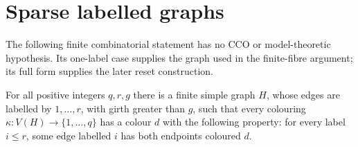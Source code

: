 \section{Sparse labelled graphs}\label{sec:sparse-labelled-graphs}

The following finite combinatorial statement has no CCO or model-theoretic
hypothesis. Its one-label case supplies the graph used in the finite-fibre
argument; its full form supplies the later reset construction.

\begin{lemma}\label{lem:sparse-labelled-graph}
For all positive integers \(q,r,g\) there is a finite simple graph \(H\),
whose edges are labelled by \(1,\ldots,r\), with girth greater than \(g\),
such that every colouring
\(\kappa:V(H)\to\{1,\ldots,q\}\) has a colour \(d\) with the following
property: for every label \(i\leq r\), some edge labelled \(i\) has both
endpoints coloured \(d\).
\end{lemma}


